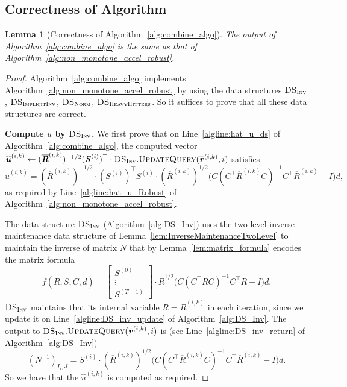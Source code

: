 \documentclass[11pt]{article}
\newtheorem{lemma}[theorem]{Lemma}
\newcommand\dd{\boldsymbol{\mathit{d}}}
\newcommand\rr{\boldsymbol{\mathit{r}}}
\newcommand\uu{\boldsymbol{\mathit{u}}}
\newcommand\CC{\boldsymbol{\mathit{C}}}
\newcommand\II{\boldsymbol{\mathit{I}}}
\newcommand\NN{\boldsymbol{\mathit{N}}}
\newcommand\RR{\boldsymbol{\mathit{R}}}
\renewcommand\SS{\boldsymbol{\mathit{S}}}
\newcommand{\wh}{\widehat}
\newcommand{\ov}{\overline}
\begin{document}
\subsection{Correctness of Algorithm}
\begin{lemma}[Correctness of Algorithm~\ref{alg:combine_algo}]
The output of Algorithm~\ref{alg:combine_algo} is the same as that of Algorithm~\ref{alg:non_monotone_accel_robust}.
\end{lemma}
\begin{proof}
Algorithm~\ref{alg:combine_algo} implements Algorithm~\ref{alg:non_monotone_accel_robust} by using the data structures $\textsc{DS}_{\textsc{Inv}}$, $\textsc{DS}_{\textsc{ImplicitInv}}$, $\textsc{DS}_{\textsc{Norm}}$, $\textsc{DS}_{\textsc{HeavyHitters}}$. So it suffices to prove that all these data structures are correct.

{\bf Compute $\wh{\uu}$ by $\textsc{DS}_{\textsc{Inv}}$.} We first prove that on Line~\ref{algline:hat_u_ds} of Algorithm~\ref{alg:combine_algo}, the computed vector $\wh{\uu}^{(i,k)} \leftarrow (\ov{\RR}^{(i,k)})^{-1/2} (\SS^{(i)})^{\top} \cdot \textsc{DS}_\textsc{Inv}.\textsc{UpdateQuery}(\ov{\rr}^{(i,k)}, i)$ satisfies
\[
\wh{\uu}^{(i,k)} = (\ov{\RR}^{(i,k)})^{-1/2} \cdot (\SS^{(i)})^{\top} \SS^{(i)} \cdot (\ov{\RR}^{(i,k)})^{1/2} \Big(\CC (\CC^{\top} \ov{\RR}^{(i,k)} \CC)^{-1} \CC^{\top} \ov{\RR}^{(i,k)} - \II\Big) \dd,
\]
as required by Line~\ref{algline:hat_u_Robust} of Algorithm~\ref{alg:non_monotone_accel_robust}. 

The data structure $\textsc{DS}_{\textsc{Inv}}$ (Algorithm~\ref{alg:DS_Inv}) uses the two-level inverse maintenance data structure of Lemma~\ref{lem:InverseMaintenanceTwoLevel} to maintain the inverse of matrix $\NN$ that by Lemma~\ref{lem:matrix_formula} encodes the matrix formula
\[
f(\ov{\RR}, \SS, \CC, \dd) = \begin{bmatrix}
\SS^{(0)} \\ \vdots \\ \SS^{(T-1)}
\end{bmatrix} \cdot \ov{\RR}^{1/2} \Big(\CC (\CC^{\top} \ov{\RR} \CC)^{-1} \CC^{\top} \ov{\RR} - \II\Big) \dd.
\]
$\textsc{DS}_{\textsc{Inv}}$ maintains that its internal variable $\ov{\RR} = \ov{\RR}^{(i,k)}$ in each iteration, since we update it on Line~\ref{algline:DS_inv_update} of Algorithm~\ref{alg:DS_Inv}. The output to $\textsc{DS}_\textsc{Inv}.\textsc{UpdateQuery}(\ov{\rr}^{(i,k)}, i)$ is (see Line~\ref{algline:DS_inv_return} of Algorithm~\ref{alg:DS_Inv})
\[
(\NN^{-1})_{I_i,J} = \SS^{(i)} \cdot (\ov{\RR}^{(i,k)})^{1/2} \Big(\CC (\CC^{\top} \ov{\RR}^{(i,k)} \CC)^{-1} \CC^{\top} \ov{\RR}^{(i,k)} - \II\Big) \dd.
\]
So we have that the $\wh{\uu}^{(i,k)}$ is computed as required.


\end{proof}
\end{document}
